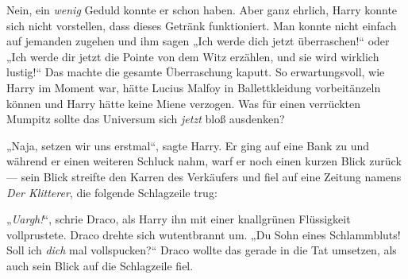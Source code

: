 Nein, ein \emph{wenig} Geduld konnte er schon haben. Aber ganz ehrlich, Harry konnte sich nicht vorstellen, dass dieses Getränk funktioniert. Man konnte nicht einfach auf jemanden zugehen und ihm sagen
„Ich werde dich jetzt überraschen!“ oder
„Ich werde dir jetzt die Pointe von dem Witz erzählen, und sie wird wirklich lustig!“ Das machte die gesamte Überraschung kaputt. So erwartungsvoll, wie Harry im Moment war, hätte Lucius Malfoy in Ballettkleidung vorbeitänzeln können und Harry hätte keine Miene verzogen. Was für einen verrückten Mumpitz sollte das Universum sich \emph{jetzt} bloß ausdenken?

„Naja, setzen wir uns erstmal“, sagte Harry. Er ging auf eine Bank zu und während er einen weiteren Schluck nahm, warf er noch einen kurzen Blick zurück — sein Blick streifte den Karren des Verkäufers und fiel auf eine Zeitung namens \emph{Der Klitterer}, die folgende Schlagzeile trug:


„\emph{Uargh!}“, schrie Draco, als Harry ihn mit einer knallgrünen Flüssigkeit vollprustete. Draco drehte sich wutentbrannt um.
„Du Sohn eines Schlammbluts! Soll ich \emph{dich} mal vollspucken?“ Draco wollte das gerade in die Tat umsetzen, als auch sein Blick auf die Schlagzeile fiel.

